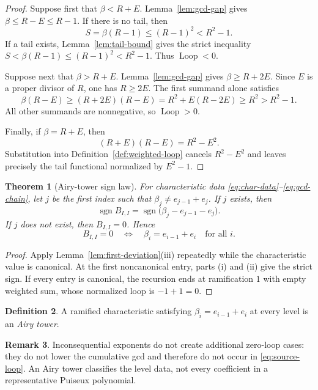 \documentclass[11pt,a4paper]{amsart}
\theoremstyle{plain}
\newtheorem{theorem}{Theorem}[section]
\theoremstyle{definition}
\newtheorem{definition}[theorem]{Definition}
\newtheorem{remark}[theorem]{Remark}
\newcommand{\Loop}{\operatorname{Loop}}
\begin{document}
\begin{proof}
Suppose first that $\beta<R+E$.  Lemma~\ref{lem:gcd-gap} gives $\beta\le R-E\le R-1$.
If there is no tail, then
\[
 S=\beta(R-1)\le(R-1)^2<R^2-1.
\]
If a tail exists, Lemma~\ref{lem:tail-bound} gives the strict inequality
$S<\beta(R-1)\le(R-1)^2<R^2-1$.  Thus $\Loop<0$.

Suppose next that $\beta>R+E$.  Lemma~\ref{lem:gcd-gap} gives $\beta\ge R+2E$.  Since $E$ is a
proper divisor of $R$, one has $R\ge2E$.  The first summand alone satisfies
\[
 \beta(R-E)\ge(R+2E)(R-E)
 =R^2+E(R-2E)\ge R^2>R^2-1.
\]
All other summands are nonnegative, so $\Loop>0$.

Finally, if $\beta=R+E$, then
\[
 (R+E)(R-E)=R^2-E^2.
\]
Substitution into Definition~\ref{def:weighted-loop} cancels $R^2-E^2$ and leaves precisely the
tail functional normalized by $E^2-1$.
\end{proof}

\begin{theorem}[Airy-tower sign law]\label{thm:sign-law}
For characteristic data \eqref{eq:char-data}--\eqref{eq:gcd-chain}, let $j$ be the first index such
that $\beta_j\ne e_{j-1}+e_j$.  If $j$ exists, then
\[
 \operatorname{sgn}B_{I,I}
 =\operatorname{sgn}\bigl(\beta_j-e_{j-1}-e_j\bigr).
\]
If $j$ does not exist, then $B_{I,I}=0$.  Hence
\[
 B_{I,I}=0\quad\Longleftrightarrow\quad
 \beta_i=e_{i-1}+e_i\quad\text{for all }i.
\]
\end{theorem}

\begin{proof}
Apply Lemma~\ref{lem:first-deviation}(iii) repeatedly while the characteristic value is canonical.
At the first noncanonical entry, parts (i) and (ii) give the strict sign.  If every entry is
canonical, the recursion ends at ramification $1$ with empty weighted sum, whose normalized loop is
$-1+1=0$.
\end{proof}

\begin{definition}
A ramified characteristic satisfying $\beta_i=e_{i-1}+e_i$ at every level is an
\emph{Airy tower}.
\end{definition}

\begin{remark}
Inconsequential exponents do not create additional zero-loop cases: they do not lower the
cumulative gcd and therefore do not occur in \eqref{eq:source-loop}.  An Airy tower classifies the
level data, not every coefficient in a representative Puiseux polynomial.
\end{remark}
\end{document}
